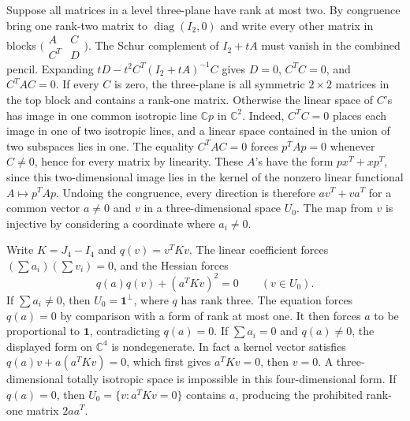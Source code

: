 Suppose all matrices in a level three-plane have rank at most two.
By congruence bring one rank-two matrix to \(\operatorname{diag}(I_2,0)\)
and write every other matrix in blocks \(\bigl(\begin{smallmatrix}A&C\\C^T&D\end{smallmatrix}\bigr)\).
The Schur complement of \(I_2+tA\) must vanish in the combined pencil.
Expanding \(tD-t^2C^T(I_2+tA)^{-1}C\) gives
\(D=0\), \(C^TC=0\), and \(C^TAC=0\). If every \(C\) is zero, the
three-plane is all symmetric \(2\times2\) matrices in the top block
and contains a rank-one matrix. Otherwise the linear space of \(C\)'s
has image in one common isotropic line \(\mathbb Cp\) in \(\mathbb C^2\).
Indeed, \(C^TC=0\) places each image in one of two isotropic lines,
and a linear space contained in the union of two subspaces lies in one.
The equality \(C^TAC=0\) forces \(p^TAp=0\) whenever \(C\ne0\), hence
for every matrix by linearity. These \(A\)'s have the form
\(px^T+xp^T\), since this two-dimensional image lies in the kernel of
the nonzero linear functional \(A\mapsto p^TAp\). Undoing the
congruence, every direction is therefore \(av^T+va^T\) for a common
vector \(a\ne0\) and \(v\) in a three-dimensional space \(U_0\). The
map from \(v\) is injective by considering a coordinate where \(a_i\ne0\).

Write \(K=J_4-I_4\) and \(q(v)=v^TKv\). The linear coefficient forces
\((\sum a_i)(\sum v_i)=0\), and the Hessian forces
\begin{equation*}
  q(a)q(v)+(a^TKv)^2=0\qquad(v\in U_0).
\end{equation*}
If \(\sum a_i\ne0\), then \(U_0=\mathbf1^\perp\), where \(q\) has
rank three. The equation forces \(q(a)=0\) by comparison with a form
of rank at most one. It then forces \(a\) to be proportional to
\(\mathbf1\), contradicting \(q(a)=0\). If \(\sum a_i=0\) and
\(q(a)\ne0\), the displayed form on \(\mathbb C^4\) is nondegenerate.
In fact a kernel vector satisfies \(q(a)v+a(a^TKv)=0\), which first
gives \(a^TKv=0\), then \(v=0\). A three-dimensional totally isotropic
space is impossible in this four-dimensional form. If \(q(a)=0\),
then \(U_0=\{v:a^TKv=0\}\) contains \(a\), producing the prohibited
rank-one matrix \(2aa^T\).

